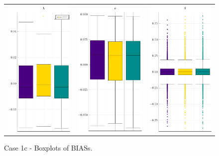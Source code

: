 \begin{figure}[ht]
	
	\centering
	\begin{tabular}[b]{c c c}
		\includegraphics[width=.3\textwidth]{Figures/1c/BIAS_b.pdf} & \includegraphics[width=.3\textwidth]{Figures/1c/BIAS_a.pdf} & \includegraphics[width=.3\textwidth]{Figures/1c/BIAS_t.pdf}
	\end{tabular}
	\caption{Case 1c - Boxplots of BIASs.}
	\label{fig:bpBIAS1c}
\end{figure}
